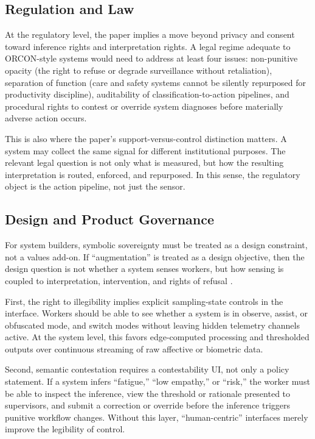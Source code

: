 \documentclass[runningheads]{llncs}
\begin{document}
\subsection{Regulation and Law}

At the regulatory level, the paper implies a move beyond privacy and consent toward inference rights and interpretation rights. A legal regime adequate to ORCON-style systems would need to address at least four issues: non-punitive opacity (the right to refuse or degrade surveillance without retaliation), separation of function (care and safety systems cannot be silently repurposed for productivity discipline), auditability of classification-to-action pipelines, and procedural rights to contest or override system diagnoses before materially adverse action occurs.

This is also where the paper's support-versus-control distinction matters. A system may collect the same signal for different institutional purposes. The relevant legal question is not only what is measured, but how the resulting interpretation is routed, enforced, and repurposed. In this sense, the regulatory object is the action pipeline, not just the sensor.

\subsection{Design and Product Governance}

For system builders, symbolic sovereignty must be treated as a design constraint, not a values add-on. If ``augmentation'' is treated as a design objective, then the design question is not whether a system senses workers, but how sensing is coupled to interpretation, intervention, and rights of refusal \cite{hwid2026cfp}.

First, the right to illegibility implies explicit sampling-state controls in the interface. Workers should be able to see whether a system is in observe, assist, or obfuscated mode, and switch modes without leaving hidden telemetry channels active. At the system level, this favors edge-computed processing and thresholded outputs over continuous streaming of raw affective or biometric data.

Second, semantic contestation requires a contestability UI, not only a policy statement. If a system infers ``fatigue,'' ``low empathy,'' or ``risk,'' the worker must be able to inspect the inference, view the threshold or rationale presented to supervisors, and submit a correction or override before the inference triggers punitive workflow changes. Without this layer, ``human-centric'' interfaces merely improve the legibility of control.
\end{document}
